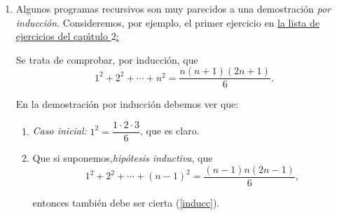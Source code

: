 \begin{enumerate}
\begin{enumerate}
\item Otros ejercicios del proyecto Euler que podemos recomendar son los n\'umeros \[2,4,8,10,12,21,24,23,26,28,29,30,35,36,37,41,45,50,57.\]

Son ejercicios del comienzo de la lista y, en general,  son m'as sencillos que los del final. Otros pocos, situados alrededor del n\'umero $400$ ser\'{\i}an

\item {\sc Ejercicio \#401:} Pide que se eval\'ue la suma de todos los cuadrados
de los divisores de un n\'umero $n$, y luego que se sumen esas sumas para $n$
entre $1$ y $N$. Puede ser dif\'{\i}cil evaluar esas sumas eficientemente para
$N$ muy grande. 
\item {\sc Ejercicio \#413:} Es un ejercicio en el manejo de cadenas de caracteres.
\item {\sc Ejercicio \#414:} En este se utilizan listas y el c\'alculo de \hyperref[orbitas]{\'orbitas}.
\item {\sc Ejercicio \#421:} Factorizaci\'on de enteros y de polinomios. {\sage} ser\'a de gran ayuda para resolverlo.
\item {\sc Ejercicio \#429:} Otro ejercicio sobre divisores de un entero.



\end{enumerate}

\item \label{induccion}Algunos programas recursivos son muy parecidos a una demostraci\'on
{\itshape por inducci\'on}. Consideremos,  por ejemplo, el primer ejercicio en 
\hyperref[rec]{la lista de ejercicios del cap\'{\i}tulo $2$:}

Se trata de comprobar, por inducci\'on, que 
\begin{equation}\label{inducc}
1^2+2^2+\cdots+n^2= \dfrac{n(n+1)(2n+1)}6.
\end{equation}

En la demostraci\'on por inducci\'on debemos ver que:

\begin{enumerate}
 \item {\itshape Caso inicial:} $1^2=\dfrac{1\cdot 2\cdot 3}6$, que es claro.
 \item Que si suponemos,{\itshape hip\'otesis inductiva},  que 
 \[ 1^2+2^2+\cdots+(n-1)^2= \dfrac{(n-1)n(2n-1)}6,\]
 
 \noindent entonces tambi\'en debe ser cierta (\ref{inducc}).
\end{enumerate}



\end{enumerate}
